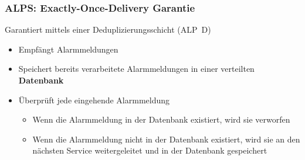 \documentclass[11pt,aspectratio=1610]{beamer} %
\begin{document}
\begin{frame}
    \frametitle{ALPS: Exactly-Once-Delivery Garantie}

    Garantiert mittels einer Deduplizierungsschicht (ALP~D)

    \medskip

    \begin{itemize}
        \item Empfängt Alarmmeldungen
        \item Speichert bereits verarbeitete Alarmmeldungen in einer verteilten \textbf{Datenbank}
        \item Überprüft jede eingehende Alarmmeldung
              \begin{itemize}
                  \item Wenn die Alarmmeldung in der Datenbank existiert, wird sie verworfen
                  \item Wenn die Alarmmeldung nicht in der Datenbank existiert, wird sie an den nächsten Service weitergeleitet und in der Datenbank gespeichert
              \end{itemize}
    \end{itemize}

\end{frame}
\end{document}
